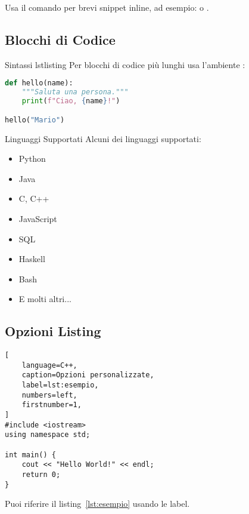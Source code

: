 \documentclass{csnotes}
\begin{document}
Usa il comando  per brevi snippet inline, 
ad esempio:  o .

\subsection{Blocchi di Codice}

\begin{example}{Sintassi lstlisting}
Per blocchi di codice più lunghi usa l'ambiente :
\end{example}

\begin{lstlisting}[language=Python, caption=Esempio base]
def hello(name):
    """Saluta una persona."""
    print(f"Ciao, {name}!")

hello("Mario")
\end{lstlisting}

\begin{note}{Linguaggi Supportati}
Alcuni dei linguaggi supportati:
\begin{itemize}
    \item Python
    \item Java
    \item C, C++
    \item JavaScript
    \item SQL
    \item Haskell
    \item Bash
    \item E molti altri...
\end{itemize}
\end{note}

\subsection{Opzioni Listing}

\begin{lstlisting}[
    language=C++,
    caption=Opzioni personalizzate,
    label=lst:esempio,
    numbers=left,
    firstnumber=1,
]
#include <iostream>
using namespace std;

int main() {
    cout << "Hello World!" << endl;
    return 0;
}
\end{lstlisting}

Puoi riferire il listing~\ref{lst:esempio} usando le label.

\newpage
\end{document}
